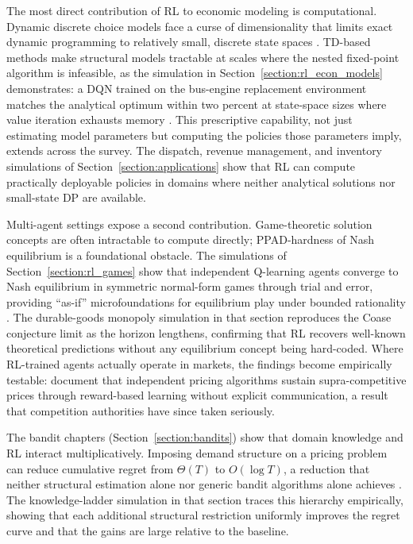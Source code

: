 The most direct contribution of RL to economic modeling is computational.
Dynamic discrete choice models face a curse of dimensionality that limits exact dynamic programming to relatively small, discrete state spaces \citep{rust2008dp}.
TD-based methods make structural models tractable at scales where the nested fixed-point algorithm is infeasible, as the simulation in Section~\ref{section:rl_econ_models} demonstrates: a DQN trained on the bus-engine replacement environment matches the analytical optimum within two percent at state-space sizes where value iteration exhausts memory \citep{Rust1987}.
This prescriptive capability, not just estimating model parameters but computing the policies those parameters imply, extends across the survey.
The dispatch, revenue management, and inventory simulations of Section~\ref{section:applications} show that RL can compute practically deployable policies in domains where neither analytical solutions nor small-state DP are available.

Multi-agent settings expose a second contribution.
Game-theoretic solution concepts are often intractable to compute directly; PPAD-hardness of Nash equilibrium \citep{Shapley1964} is a foundational obstacle.
The simulations of Section~\ref{section:rl_games} show that independent Q-learning agents converge to Nash equilibrium in symmetric normal-form games through trial and error, providing ``as-if'' microfoundations for equilibrium play under bounded rationality \citep{FudenbergLevine1998}.
The durable-goods monopoly simulation in that section reproduces the Coase conjecture limit as the horizon lengthens, confirming that RL recovers well-known theoretical predictions without any equilibrium concept being hard-coded.
Where RL-trained agents actually operate in markets, the findings become empirically testable: \citet{Calvano2020} document that independent pricing algorithms sustain supra-competitive prices through reward-based learning without explicit communication, a result that competition authorities have since taken seriously.

The bandit chapters (Section~\ref{section:bandits}) show that domain knowledge and RL interact multiplicatively.
Imposing demand structure on a pricing problem can reduce cumulative regret from $\Theta(T)$ to $O(\log T)$, a reduction that neither structural estimation alone nor generic bandit algorithms alone achieves \citep{Agrawal2024ref}.
The knowledge-ladder simulation in that section traces this hierarchy empirically, showing that each additional structural restriction uniformly improves the regret curve and that the gains are large relative to the baseline.

